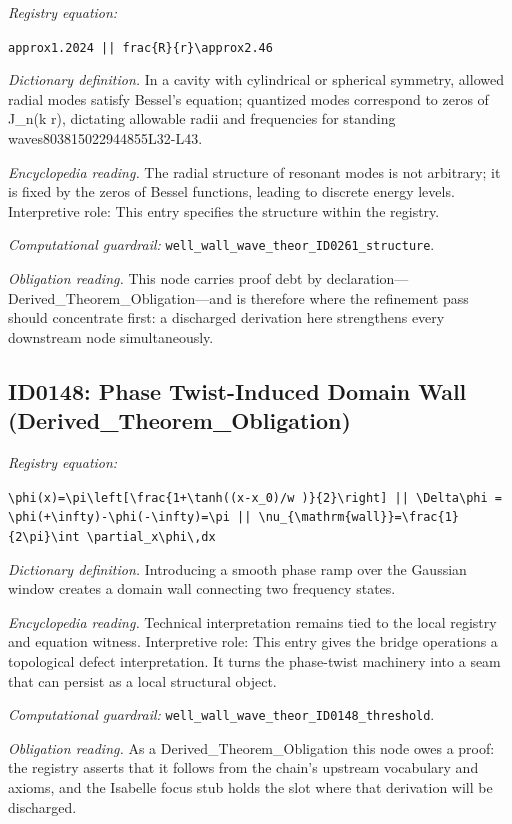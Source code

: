 \documentclass[11pt]{article}
\theoremstyle{remark}
\begin{document}
\noindent\textit{Registry equation:}\par
{\small\texttt{approx1.2024 || frac\{R\}\{r\}\textbackslash{}approx2.46}}\par\medskip
\noindent\textit{Dictionary definition.} In a cavity with cylindrical or spherical symmetry, allowed radial modes satisfy Bessel's equation; quantized modes correspond to zeros of J\_n(k r), dictating allowable radii and frequencies for standing waves803815022944855L32-L43.\par\medskip
\noindent\textit{Encyclopedia reading.} The radial structure of resonant modes is not arbitrary; it is fixed by the zeros of Bessel functions, leading to discrete energy levels. Interpretive role: This entry specifies the structure within the registry.
\par\medskip\noindent\textit{Computational guardrail:} \texttt{well\_wall\_wave\_theor\_ID0261\_structure}.
\par\medskip\noindent\textit{Obligation reading.} This node carries proof debt by declaration---Derived\_Theorem\_Obligation---and is therefore where the refinement pass should concentrate first: a discharged derivation here strengthens every downstream node simultaneously.

\subsection{ID0148: Phase Twist-Induced Domain Wall (Derived\_Theorem\_Obligation)}

\noindent\textit{Registry equation:}\par
{\small\texttt{\textbackslash{}phi(x)=\textbackslash{}pi\textbackslash{}left[\textbackslash{}frac\{1+\textbackslash{}tanh((x-x\_0)/w )\}\{2\}\textbackslash{}right] || \textbackslash{}Delta\textbackslash{}phi = \textbackslash{}phi(+\textbackslash{}infty)-\textbackslash{}phi(-\textbackslash{}infty)=\textbackslash{}pi || \textbackslash{}nu\_\{\textbackslash{}mathrm\{wall\}\}=\textbackslash{}frac\{1\}\{2\textbackslash{}pi\}\textbackslash{}int \textbackslash{}partial\_x\textbackslash{}phi\textbackslash{},dx}}\par\medskip
\noindent\textit{Dictionary definition.} Introducing a smooth phase ramp over the Gaussian window creates a domain wall connecting two frequency states.\par\medskip
\noindent\textit{Encyclopedia reading.} Technical interpretation remains tied to the local registry and equation witness. Interpretive role: This entry gives the bridge operations a topological defect interpretation. It turns the phase-twist machinery into a seam that can persist as a local structural object.
\par\medskip\noindent\textit{Computational guardrail:} \texttt{well\_wall\_wave\_theor\_ID0148\_threshold}.
\par\medskip\noindent\textit{Obligation reading.} As a Derived\_Theorem\_Obligation this node owes a proof: the registry asserts that it follows from the chain's upstream vocabulary and axioms, and the Isabelle focus stub holds the slot where that derivation will be discharged.
\end{document}
